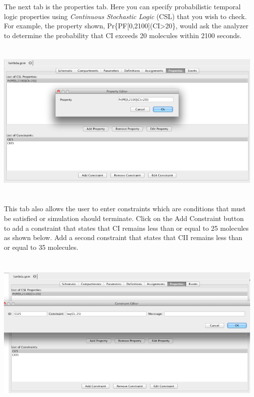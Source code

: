 \documentclass[titlepage,11pt]{article}
\begin{document}
The next tab is the properties tab.  Here you can specify probabilistic temporal logic properties using \emph{Continuous Stochastic Logic} (CSL) that you wish to check.  For example, the property shown,
Pr\{PF[0,2100](CI>20\}, would ask the analyzer to determine the probability that CI exceeds 20 molecules within 2100 seconds.

\begin{center}
\includegraphics[height=80mm]{screenshots/properties}
\end{center}

This tab also allows the user to enter constraints which are conditions that must be satisfied or simulation should terminate.  Click on the Add Constraint button to add a constraint that states that CI remains less than or equal to 25 molecules as shown below.  Add a second constraint that states that CII remains less than or equal to 35 molecules.

\begin{center}
\includegraphics[height=80mm]{screenshots/constraint}
\end{center}
\end{document}
